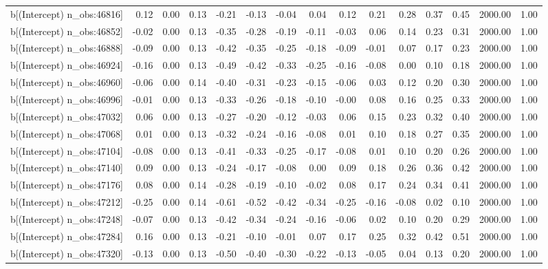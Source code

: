 \begin{table}[ht]
\begin{tabular}{rrrrrrrrrrrrrrr}
  b[(Intercept) n\_obs:46816] & 0.12 & 0.00 & 0.13 & -0.21 & -0.13 & -0.04 & 0.04 & 0.12 & 0.21 & 0.28 & 0.37 & 0.45 & 2000.00 & 1.00 \\ 
  b[(Intercept) n\_obs:46852] & -0.02 & 0.00 & 0.13 & -0.35 & -0.28 & -0.19 & -0.11 & -0.03 & 0.06 & 0.14 & 0.23 & 0.31 & 2000.00 & 1.00 \\ 
  b[(Intercept) n\_obs:46888] & -0.09 & 0.00 & 0.13 & -0.42 & -0.35 & -0.25 & -0.18 & -0.09 & -0.01 & 0.07 & 0.17 & 0.23 & 2000.00 & 1.00 \\ 
  b[(Intercept) n\_obs:46924] & -0.16 & 0.00 & 0.13 & -0.49 & -0.42 & -0.33 & -0.25 & -0.16 & -0.08 & 0.00 & 0.10 & 0.18 & 2000.00 & 1.00 \\ 
  b[(Intercept) n\_obs:46960] & -0.06 & 0.00 & 0.14 & -0.40 & -0.31 & -0.23 & -0.15 & -0.06 & 0.03 & 0.12 & 0.20 & 0.30 & 2000.00 & 1.00 \\ 
  b[(Intercept) n\_obs:46996] & -0.01 & 0.00 & 0.13 & -0.33 & -0.26 & -0.18 & -0.10 & -0.00 & 0.08 & 0.16 & 0.25 & 0.33 & 2000.00 & 1.00 \\ 
  b[(Intercept) n\_obs:47032] & 0.06 & 0.00 & 0.13 & -0.27 & -0.20 & -0.12 & -0.03 & 0.06 & 0.15 & 0.23 & 0.32 & 0.40 & 2000.00 & 1.00 \\ 
  b[(Intercept) n\_obs:47068] & 0.01 & 0.00 & 0.13 & -0.32 & -0.24 & -0.16 & -0.08 & 0.01 & 0.10 & 0.18 & 0.27 & 0.35 & 2000.00 & 1.00 \\ 
  b[(Intercept) n\_obs:47104] & -0.08 & 0.00 & 0.13 & -0.41 & -0.33 & -0.25 & -0.17 & -0.08 & 0.01 & 0.10 & 0.20 & 0.26 & 2000.00 & 1.00 \\ 
  b[(Intercept) n\_obs:47140] & 0.09 & 0.00 & 0.13 & -0.24 & -0.17 & -0.08 & 0.00 & 0.09 & 0.18 & 0.26 & 0.36 & 0.42 & 2000.00 & 1.00 \\ 
  b[(Intercept) n\_obs:47176] & 0.08 & 0.00 & 0.14 & -0.28 & -0.19 & -0.10 & -0.02 & 0.08 & 0.17 & 0.24 & 0.34 & 0.41 & 2000.00 & 1.00 \\ 
  b[(Intercept) n\_obs:47212] & -0.25 & 0.00 & 0.14 & -0.61 & -0.52 & -0.42 & -0.34 & -0.25 & -0.16 & -0.08 & 0.02 & 0.10 & 2000.00 & 1.00 \\ 
  b[(Intercept) n\_obs:47248] & -0.07 & 0.00 & 0.13 & -0.42 & -0.34 & -0.24 & -0.16 & -0.06 & 0.02 & 0.10 & 0.20 & 0.29 & 2000.00 & 1.00 \\ 
  b[(Intercept) n\_obs:47284] & 0.16 & 0.00 & 0.13 & -0.21 & -0.10 & -0.01 & 0.07 & 0.17 & 0.25 & 0.32 & 0.42 & 0.51 & 2000.00 & 1.00 \\ 
  b[(Intercept) n\_obs:47320] & -0.13 & 0.00 & 0.13 & -0.50 & -0.40 & -0.30 & -0.22 & -0.13 & -0.05 & 0.04 & 0.13 & 0.20 & 2000.00 & 1.00 \\ 

\end{tabular}
\end{table}
